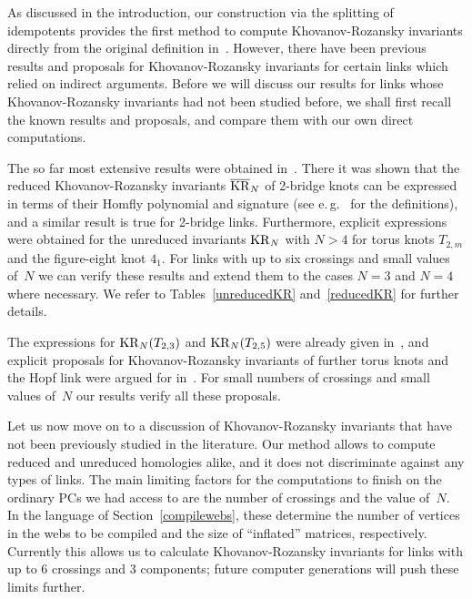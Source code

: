 \documentclass{compositio}
\theoremstyle{definition}
\numberwithin{equation}{section}
\begin{document}
As discussed in the introduction, our construction via the splitting of idempotents provides the first method to compute Khovanov-Rozansky invariants directly from the original definition in~\cite{kr0401268}. However, there have been previous results and proposals for Khovanov-Rozansky invariants for certain links which relied on indirect arguments. Before we will discuss our results for links whose Khovanov-Rozansky invariants had not been studied before, we shall first recall the known results and proposals, and compare them with our own direct computations. 

The so far most extensive results were obtained in~\cite{r0508510, r0607544}. There it was shown that the reduced Khovanov-Rozansky invariants $\overline{\operatorname{KR}}_{N}$ of 2-bridge knots can be expressed in terms of their Homfly polynomial and signature (see e.\,g.~\cite{kawauchibook} for the definitions), and a similar result is true for 2-bridge links. Furthermore, explicit expressions were obtained for the unreduced invariants $\operatorname{KR}_{N}$ with $N>4$ for torus knots $T_{2,m}$ and the figure-eight knot $4_{1}$. For links with up to six crossings and small values of~$N$ we can verify these results and extend them to the cases $N=3$ and $N=4$ where necessary. We refer to Tables~\ref{unreducedKR} and~\ref{reducedKR} for further details. 

The expressions for $\operatorname{KR}_{N}(T_{2,3})$ and $\operatorname{KR}_{N}(T_{2,5})$ were already given in~\cite{gsv0412243}, and explicit proposals for Khovanov-Rozansky invariants of further torus knots and the Hopf link were argued for in~\cite{dgr0505662, gikv0705.1368, as1105.5117}. For small numbers of crossings and small values of~$N$ our results verify all these proposals. 

\medskip

Let us now move on to a discussion of Khovanov-Rozansky invariants that have not been previously studied in the literature. Our method allows to compute reduced and unreduced homologies alike, and it does not discriminate against any types of links. The main limiting factors for the computations to finish on the ordinary PCs we had access to are the number of crossings and the value of~$N$. In the language of Section~\ref{compilewebs}, these determine the number of vertices in the webs to be compiled and the size of ``inflated'' matrices, respectively. Currently this allows us to calculate Khovanov-Rozansky invariants for links with up to 6 crossings and 3 components; future computer generations will push these limits further. 
\end{document}
